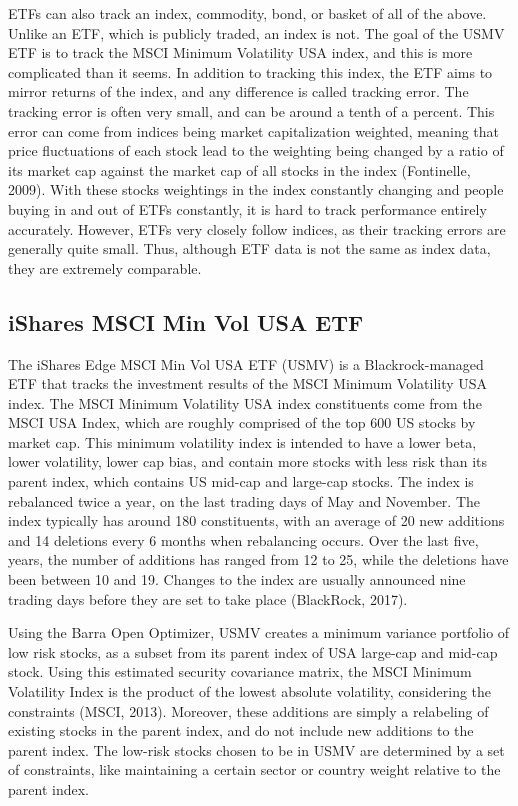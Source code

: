 \documentclass[12pt,twoside]{reedthesis}
\theoremstyle{definition}
\theoremstyle{definition}
\theoremstyle{definition}
\theoremstyle{remark}
\begin{document}
ETFs can also track an index, commodity, bond, or basket of all of the
above. Unlike an ETF, which is publicly traded, an index is not. The
goal of the USMV ETF is to track the MSCI Minimum Volatility USA index,
and this is more complicated than it seems. In addition to tracking this
index, the ETF aims to mirror returns of the index, and any difference
is called tracking error. The tracking error is often very small, and
can be around a tenth of a percent. This error can come from indices
being market capitalization weighted, meaning that price fluctuations of
each stock lead to the weighting being changed by a ratio of its market
cap against the market cap of all stocks in the index (Fontinelle,
2009). With these stocks weightings in the index constantly changing and
people buying in and out of ETFs constantly, it is hard to track
performance entirely accurately. However, ETFs very closely follow
indices, as their tracking errors are generally quite small. Thus,
although ETF data is not the same as index data, they are extremely
comparable.

\subsection{iShares MSCI Min Vol USA
ETF}\label{ishares-msci-min-vol-usa-etf}

The iShares Edge MSCI Min Vol USA ETF (USMV) is a Blackrock-managed ETF
that tracks the investment results of the MSCI Minimum Volatility USA
index. The MSCI Minimum Volatility USA index constituents come from the
MSCI USA Index, which are roughly comprised of the top 600 US stocks by
market cap. This minimum volatility index is intended to have a lower
beta, lower volatility, lower cap bias, and contain more stocks with
less risk than its parent index, which contains US mid-cap and large-cap
stocks. The index is rebalanced twice a year, on the last trading days
of May and November. The index typically has around 180 constituents,
with an average of 20 new additions and 14 deletions every 6 months when
rebalancing occurs. Over the last five, years, the number of additions
has ranged from 12 to 25, while the deletions have been between 10 and
19. Changes to the index are usually announced nine trading days before
they are set to take place (BlackRock, 2017).

Using the Barra Open Optimizer, USMV creates a minimum variance
portfolio of low risk stocks, as a subset from its parent index of USA
large-cap and mid-cap stock. Using this estimated security covariance
matrix, the MSCI Minimum Volatility Index is the product of the lowest
absolute volatility, considering the constraints (MSCI, 2013). Moreover,
these additions are simply a relabeling of existing stocks in the parent
index, and do not include new additions to the parent index. The
low-risk stocks chosen to be in USMV are determined by a set of
constraints, like maintaining a certain sector or country weight
relative to the parent index.
\end{document}
